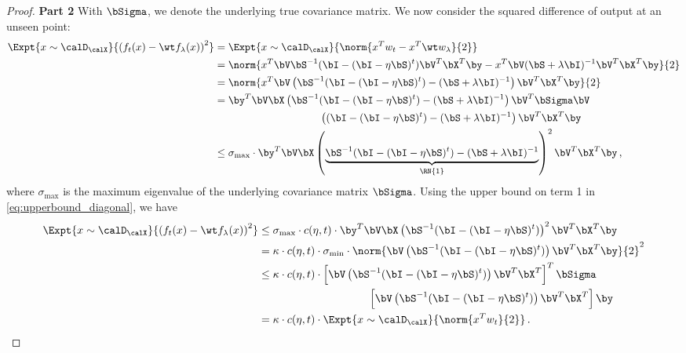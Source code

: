 \begin{proof}
    \textbf{Part 2 {} {}} With $\bSigma$, 
    we denote the underlying true covariance matrix. 
    We now consider the squared difference of output at an unseen point: 
    \begin{align}
        \Expt{ x \sim \calD_{\calX} }{\left(f_t(x) - \wt f_\lambda (x)\right)^2} &= \Expt{x \sim \calD_{\calX}}{\norm{x^T w_t - x^T \wt w_\lambda}{2}} \\
        &=   \norm{x^T \bV \bS ^{-1} ( \bI - (\bI - \eta \bS)^t ) \bV^T \bX^T \by - x^T \bV (\bS + \lambda \bI )^{-1} \bV^T \bX^T \by }{2} \\
        &= \norm{x^T \bV \left(\bS ^{-1} ( \bI - (\bI - \eta \bS)^t ) - (\bS + \lambda \bI )^{-1} \right) \bV^T \bX^T \by  }{2} \\
        &= \by^T \bV \bX \left( \bS ^{-1} ( \bI - (\bI - \eta \bS)^t ) - (\bS + \lambda \bI )^{-1} \right) \bV^T \bSigma \bV \\ &\qquad \qquad \qquad \qquad \qquad \left( (\bI - (\bI - \eta \bS)^t ) - (\bS + \lambda \bI )^{-1} \right) \bV^T \bX^T \by \\
        &\le \sigma_{\text{max}} \cdot \by^T \bV \bX \left( \underbrace{\bS ^{-1} ( \bI - (\bI - \eta \bS)^t ) - (\bS + \lambda \bI )^{-1}}_{\RN{1}} \right)^2 \bV^T \bX^T \by \,, \label{eq:test_GD_rel}
    \end{align}
    where $\sigma_{\text{max}}$ is the maximum eigenvalue 
    of the underlying covariance matrix $\bSigma$. 
    Using the upper bound on term 1 in \eqref{eq:upperbound_diagonal}, 
    we have 
    \begin{align}
        \Expt{ x \sim \calD_{\calX} }{\left(f_t(x) - \wt f_\lambda (x)\right)^2} &\le \sigma_{\text{max}} \cdot c(\eta, t) \cdot \by^T \bV \bX  \left( \bS^{-1} ( \bI - (\bI - \eta \bS)^t ) \right)^2 \bV^T \bX^T \by \\
        &=   \kappa \cdot c(\eta, t) \cdot \sigma_{\text{min}}\cdot \norm{\bV \left( \bS^{-1} ( \bI - (\bI - \eta \bS)^t ) \right) \bV^T \bX^T \by}{2}^2 \\
        &\le \kappa \cdot c(\eta, t) \cdot \left[ \bV \left( \bS^{-1} ( \bI - (\bI - \eta \bS)^t ) \right) \bV^T \bX^T \right]^T \bSigma \\
        &\qquad \qquad \qquad \qquad \qquad \left[ \bV \left( \bS^{-1} ( \bI - (\bI - \eta \bS)^t ) \right) \bV^T \bX^T \right] \by \\
        & = \kappa \cdot c(\eta, t) \cdot \Expt{x \sim \calD_{\calX}}{\norm{x^T w_t}{2}} \,.
    \end{align}
% 
% 
\end{proof}

